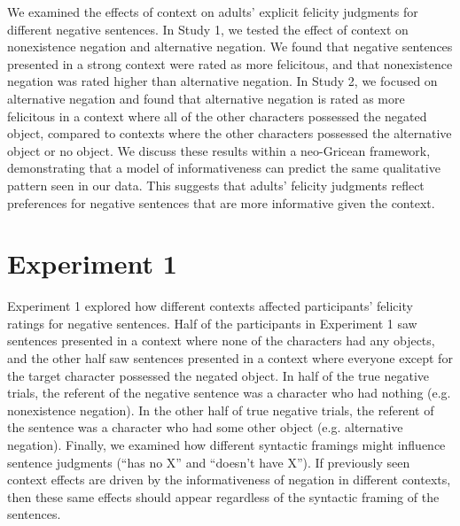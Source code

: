 \documentclass[10pt,letterpaper]{article}
\begin{document}

We examined the effects of context on adults' explicit felicity judgments for different negative sentences.  In Study 1, we tested the effect of context on nonexistence negation and alternative negation.  We found that negative sentences presented in a strong context were rated as more felicitous, and that nonexistence negation was rated higher than alternative negation.  In Study 2, we focused on alternative negation and found that alternative negation is rated as more felicitous in a context where all of the other characters possessed the negated object, compared to contexts where the other characters possessed the alternative object or no object.  We discuss these results within a neo-Gricean framework, demonstrating that a model of informativeness can predict the same qualitative pattern seen in our data.  This suggests that adults' felicity judgments reflect preferences for negative sentences that are more informative given the context.  

\section{Experiment 1}

Experiment 1 explored how different contexts affected participants' felicity ratings for negative sentences.  Half of the participants in Experiment 1 saw sentences presented in a context where none of the characters had any objects, and the other half saw sentences presented in a context where everyone except for the target character possessed the negated object.  In half of the true negative trials, the referent of the negative sentence was a character who had nothing (e.g. nonexistence negation).  In the other half of true negative trials, the referent of the sentence was a character who had some other object (e.g. alternative negation).  
Finally, we examined how different syntactic framings might influence sentence judgments (``has no X'' and ``doesn't have X''). 
If previously seen context effects are driven by the informativeness of negation in different contexts, then these same effects should appear regardless of the syntactic framing of the sentences.  
\end{document}
